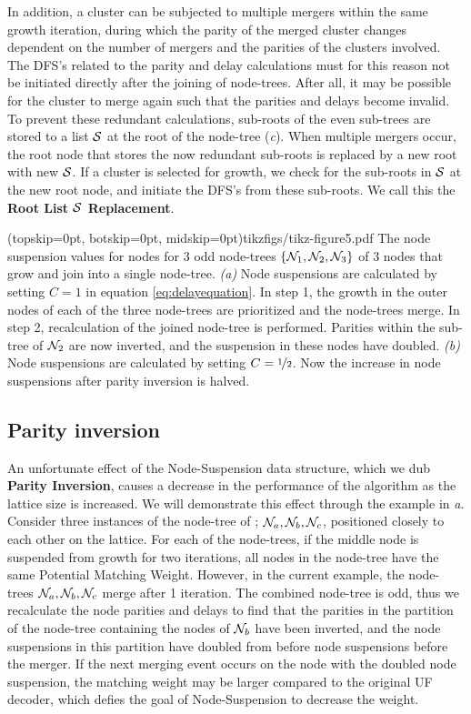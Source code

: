 In addition, a cluster can be subjected to multiple mergers within the same growth iteration, during which the parity of the merged cluster changes dependent on the number of mergers and the parities of the clusters involved. The DFS's related to the parity and delay calculations must for this reason not be initiated directly after the joining of node-trees. After all, it may be possible for the cluster to merge again such that the parities and delays become invalid. To prevent these redundant calculations, sub-roots of the even sub-trees are stored to a list $\mathcal{S}$ at the root of the node-tree (\emph{c}). When multiple mergers occur, the root node that stores the now redundant sub-roots is replaced by a new root with new $\mathcal{S}$. If a cluster is selected for growth, we check for the sub-roots in $\mathcal{S}$ at the new root node, and initiate the DFS's from these sub-roots. We call this the \textbf{Root List $\mathcal{S}$ Replacement}. 

\Figure[htb](topskip=0pt, botskip=0pt, midskip=0pt){tikzfigs/tikz-figure5.pdf}{
    The node suspension values for nodes for 3 odd node-trees $\{\mathcal{N}_1, \mathcal{N}_2, \mathcal{N}_3\}$ of 3 nodes that grow and join into a single node-tree. \emph{(a)} Node suspensions are calculated by setting $C=1$ in equation \eqref{eq:delayequation}. In step 1, the growth in the outer nodes of each of the three node-trees are prioritized and the node-trees merge. In step 2, recalculation of the joined node-tree is performed. Parities within the sub-tree of $\mathcal{N}_2$ are now inverted, and the suspension in these nodes have doubled. \emph{(b)} Node suspensions are calculated by setting $C=\nicefrac{1}{2}$. Now the increase in node suspensions after parity inversion is halved.\label{fig5}}

\subsection{Parity inversion}\label{sec:inversion}
An unfortunate effect of the Node-Suspension data structure, which we dub \textbf{Parity Inversion}, causes a decrease in the performance of the algorithm as the lattice size is increased. We will demonstrate this effect through the example in \emph{a}. Consider three instances of the node-tree of ; $\mathcal{N}_a, \mathcal{N}_b, \mathcal{N}_c$, positioned closely to each other on the lattice. For each of the node-trees, if the middle node is suspended from growth for two iterations, all nodes in the node-tree have the same Potential Matching Weight. However, in the current example, the node-trees $\mathcal{N}_a, \mathcal{N}_b, \mathcal{N}_c$ merge after 1 iteration. The combined node-tree is odd, thus we recalculate the node parities and delays to find that the parities in the partition of the node-tree containing the nodes of $\mathcal{N}_b$ have been inverted, and the node suspensions in this partition have doubled from before node suspensions before the merger. If the next merging event occurs on the node with the doubled node suspension, the matching weight may be larger compared to the original UF decoder, which defies the goal of Node-Suspension to decrease the weight.

